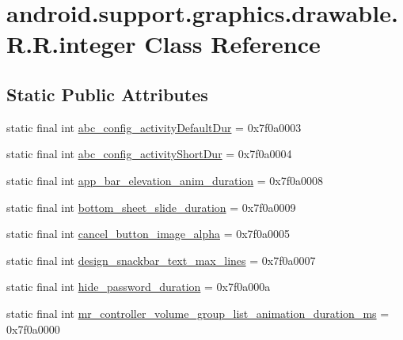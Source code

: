 \hypertarget{classandroid_1_1support_1_1graphics_1_1drawable_1_1_r_1_1integer}{
\section{android.support.graphics.drawable.R.R.integer Class Reference}
\label{classandroid_1_1support_1_1graphics_1_1drawable_1_1_r_1_1integer}
}
\subsection*{Static Public Attributes}
\begin{CompactItemize}
\item 
static final int \hyperlink{classandroid_1_1support_1_1graphics_1_1drawable_1_1_r_1_1integer_bdb1254574902e5e113a9ff2b2ca8f8c}{abc\_\-config\_\-activityDefaultDur} = 0x7f0a0003
\item 
static final int \hyperlink{classandroid_1_1support_1_1graphics_1_1drawable_1_1_r_1_1integer_5143a305f0820d9e971aa306dd753e2f}{abc\_\-config\_\-activityShortDur} = 0x7f0a0004
\item 
static final int \hyperlink{classandroid_1_1support_1_1graphics_1_1drawable_1_1_r_1_1integer_89b794ecf3f2e3987c081980966876f1}{app\_\-bar\_\-elevation\_\-anim\_\-duration} = 0x7f0a0008
\item 
static final int \hyperlink{classandroid_1_1support_1_1graphics_1_1drawable_1_1_r_1_1integer_ac62b97f1e15e9b2e9cd1ec01e4bdcc4}{bottom\_\-sheet\_\-slide\_\-duration} = 0x7f0a0009
\item 
static final int \hyperlink{classandroid_1_1support_1_1graphics_1_1drawable_1_1_r_1_1integer_f4c01c5cc1df094a8eebfbe643ed8d78}{cancel\_\-button\_\-image\_\-alpha} = 0x7f0a0005
\item 
static final int \hyperlink{classandroid_1_1support_1_1graphics_1_1drawable_1_1_r_1_1integer_3b29763e86f8a55a9da8c8b9c4bd448c}{design\_\-snackbar\_\-text\_\-max\_\-lines} = 0x7f0a0007
\item 
static final int \hyperlink{classandroid_1_1support_1_1graphics_1_1drawable_1_1_r_1_1integer_d07e8579c30784effa1821255f3d4eb3}{hide\_\-password\_\-duration} = 0x7f0a000a
\item 
static final int \hyperlink{classandroid_1_1support_1_1graphics_1_1drawable_1_1_r_1_1integer_cd1d8c8394f233d904ce2f58c8165e27}{mr\_\-controller\_\-volume\_\-group\_\-list\_\-animation\_\-duration\_\-ms} = 0x7f0a0000
\item 

\end{CompactItemize}
